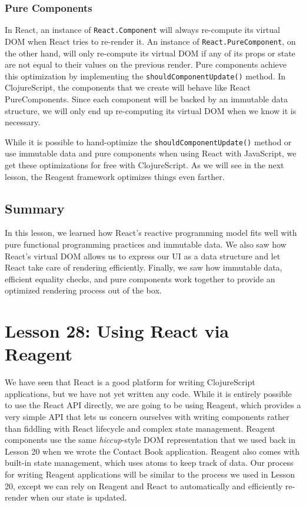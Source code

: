 \documentclass[10pt,twoside,openright]{memoir}
\begin{document}
\subsection{Pure Components}

In React, an instance of \texttt{React.Component} will always re-compute
its virtual DOM when React tries to re-render it. An instance of
\texttt{React.PureComponent}, on the other hand, will only re-compute
its virtual DOM if any of its props or state are not equal to their
values on the previous render. Pure components achieve this optimization
by implementing the \texttt{shouldComponentUpdate()} method. In
ClojureScript, the components that we create will behave like React
PureComponents. Since each component will be backed by an immutable data
structure, we will only end up re-computing its virtual DOM when we know
it is necessary.

While it is possible to hand-optimize the
\texttt{shouldComponentUpdate()} method or use immutable data and pure
components when using React with JavaScript, we get these optimizations
for free with ClojureScript. As we will see in the next lesson, the
Reagent framework optimizes things even farther.


\section{Summary}

In this lesson, we learned how React's reactive programming model fits
well with pure functional programming practices and immutable data. We
also saw how React's virtual DOM allows us to express our UI as a data
structure and let React take care of rendering efficiently. Finally, we
saw how immutable data, efficient equality checks, and pure components
work together to provide an optimized rendering process out of the box.

\chapter{Lesson 28: Using React via Reagent}

We have seen that React is a good platform for writing ClojureScript
applications, but we have not yet written any code. While it is entirely
possible to use the React API directly, we are going to be using
Reagent, which provides a very simple API that lets us concern ourselves
with writing components rather than fiddling with React lifecycle and
complex state management. Reagent components use the same
\emph{hiccup}-style DOM representation that we used back in Lesson 20 when we
wrote the Contact Book application. Reagent also comes with built-in
state management, which uses atoms to keep track of data. Our process
for writing Reagent applications will be similar to the process we used
in Lesson 20, except we can rely on Reagent and React to automatically
and efficiently re-render when our state is updated.
\end{document}
